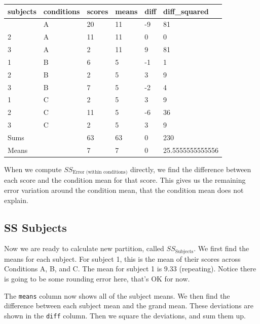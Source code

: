 \documentclass[
  letterpaper,
  DIV=11,
  numbers=noendperiod]{scrreprt}
\begin{document}
\begin{longtable}[]{@{}llllll@{}}
\toprule\noalign{}
subjects & conditions & scores & means & diff & diff\_squared \\
\midrule\noalign{}
\endhead
\bottomrule\noalign{}
\endlastfoot
1 & A & 20 & 11 & -9 & 81 \\
2 & A & 11 & 11 & 0 & 0 \\
3 & A & 2 & 11 & 9 & 81 \\
1 & B & 6 & 5 & -1 & 1 \\
2 & B & 2 & 5 & 3 & 9 \\
3 & B & 7 & 5 & -2 & 4 \\
1 & C & 2 & 5 & 3 & 9 \\
2 & C & 11 & 5 & -6 & 36 \\
3 & C & 2 & 5 & 3 & 9 \\
Sums & & 63 & 63 & 0 & 230 \\
Means & & 7 & 7 & 0 & 25.5555555555556 \\
\end{longtable}

When we compute \(SS_\text{Error (within conditions)}\) directly, we
find the difference between each score and the condition mean for that
score. This gives us the remaining error variation around the condition
mean, that the condition mean does not explain.

\subsection{SS Subjects}\label{ss-subjects}

Now we are ready to calculate new partition, called
\(SS_\text{Subjects}\). We first find the means for each subject. For
subject 1, this is the mean of their scores across Conditions A, B, and
C. The mean for subject 1 is 9.33 (repeating). Notice there is going to
be some rounding error here, that's OK for now.

The \texttt{means} column now shows all of the subject means. We then
find the difference between each subject mean and the grand mean. These
deviations are shown in the \texttt{diff} column. Then we square the
deviations, and sum them up.
\end{document}
